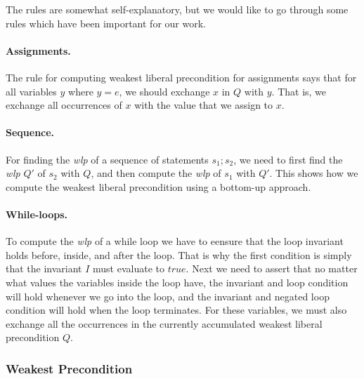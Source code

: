 The rules are somewhat self-explanatory, but we would like to go through some rules which have been important for our work.

\paragraph{Assignments.}
The rule for computing weakest liberal precondition for assignments says that for all variables $y$ where $y = e$, we should exchange $x$ in $Q$ with $y$. That is, we exchange all occurrences of $x$ with the value that we assign to $x$.

\paragraph{Sequence.}
For finding the \textit{wlp} of a sequence of statements $s_1;s_2$, we need to first find the \textit{wlp} $Q'$ of $s_2$ with $Q$, and then compute the \textit{wlp} of $s_1$ with $Q'$. This shows how we compute the weakest liberal precondition using a bottom-up approach.

\paragraph{While-loops.}
To compute the \textit{wlp} of a while loop we have to eensure that the loop invariant holds before, inside, and after the loop. That is why the first condition is simply that the invariant $I$ must evaluate to $true$.
Next we need to assert that no matter what values the variables inside the loop have, the invariant and loop condition will hold whenever we go into the loop, and the invariant and negated loop condition will hold when the loop terminates.
For these variables, we must also exchange all the occurrences in the currently accumulated weakest liberal precondition $Q$.

\subsubsection{Weakest Precondition}

